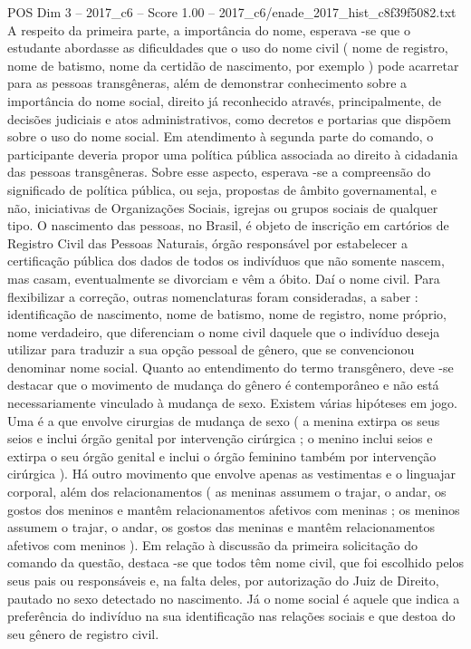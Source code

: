 \begin{textsample}{POS Dim 3 – 2017\_c6 – Score 1.00 – 2017\_c6/enade\_2017\_hist\_c8f39f5082.txt}
A respeito da primeira parte, a importância do nome, esperava -se que o estudante abordasse as dificuldades que o uso do nome civil ( nome de registro, nome de batismo, nome da certidão de nascimento, por exemplo ) pode acarretar para as pessoas transgêneras, além de demonstrar conhecimento sobre a importância do nome social, direito já reconhecido através, principalmente, de decisões judiciais e atos administrativos, como decretos e portarias que dispõem sobre o uso do nome social.
Em atendimento à segunda parte do comando, o participante deveria propor uma política pública associada ao direito à cidadania das pessoas transgêneras.
Sobre esse aspecto, esperava -se a compreensão do significado de política pública, ou seja, propostas de âmbito governamental, e não, iniciativas de Organizações Sociais, igrejas ou grupos sociais de qualquer tipo.
O nascimento das pessoas, no Brasil, é objeto de inscrição em cartórios de Registro Civil das Pessoas Naturais, órgão responsável por estabelecer a certificação pública dos dados de todos os indivíduos que não somente nascem, mas casam, eventualmente se divorciam e vêm a óbito.
Daí o nome civil.
Para flexibilizar a correção, outras nomenclaturas foram consideradas, a saber : identificação de nascimento, nome de batismo, nome de registro, nome próprio, nome verdadeiro, que diferenciam o nome civil daquele que o indivíduo deseja utilizar para traduzir a sua opção pessoal de gênero, que se convencionou denominar nome social.
Quanto ao entendimento do termo transgênero, deve -se destacar que o movimento de mudança do gênero é contemporâneo e não está necessariamente vinculado à mudança de sexo.
Existem várias hipóteses em jogo.
Uma é a que envolve cirurgias de mudança de sexo ( a menina extirpa os seus seios e inclui órgão genital por intervenção cirúrgica ; o menino inclui seios e extirpa o seu órgão genital e inclui o órgão feminino também por intervenção cirúrgica ).
Há outro movimento que envolve apenas as vestimentas e o linguajar corporal, além dos relacionamentos ( as meninas assumem o trajar, o andar, os gostos dos meninos e mantêm relacionamentos afetivos com meninas ; os meninos assumem o trajar, o andar, os gostos das meninas e mantêm relacionamentos afetivos com meninos ).
Em relação à discussão da primeira solicitação do comando da questão, destaca -se que todos têm nome civil, que foi escolhido pelos seus pais ou responsáveis e, na falta deles, por autorização do Juiz de Direito, pautado no sexo detectado no nascimento.
Já o nome social é aquele que indica a preferência do indivíduo na sua identificação nas relações sociais e que destoa do seu gênero de registro civil.

\end{textsample}
